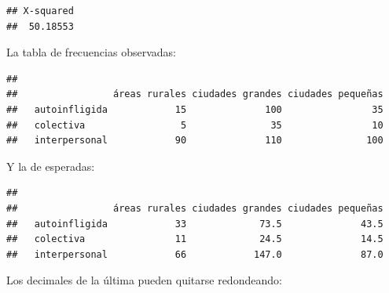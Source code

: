 \documentclass[]{book}
\newenvironment{Shaded}{\begin{snugshade}}{\end{snugshade}}
\newcommand{\DecValTok}[1]{\textcolor[rgb]{0.00,0.00,0.81}{#1}}
\newcommand{\KeywordTok}[1]{\textcolor[rgb]{0.13,0.29,0.53}{\textbf{#1}}}
\newcommand{\NormalTok}[1]{#1}
\newcommand{\OperatorTok}[1]{\textcolor[rgb]{0.81,0.36,0.00}{\textbf{#1}}}
\begin{document}
\begin{Shaded}
\end{Shaded}

\begin{verbatim}
## X-squared 
##  50.18553
\end{verbatim}

La tabla de frecuencias observadas:

\begin{Shaded}
\end{Shaded}

\begin{verbatim}
##                
##                 áreas rurales ciudades grandes ciudades pequeñas
##   autoinfligida            15              100                35
##   colectiva                 5               35                10
##   interpersonal            90              110               100
\end{verbatim}

Y la de esperadas:

\begin{Shaded}
\end{Shaded}

\begin{verbatim}
##                
##                 áreas rurales ciudades grandes ciudades pequeñas
##   autoinfligida            33             73.5              43.5
##   colectiva                11             24.5              14.5
##   interpersonal            66            147.0              87.0
\end{verbatim}

Los decimales de la última pueden quitarse redondeando:

\begin{Shaded}
\end{Shaded}
\end{document}
